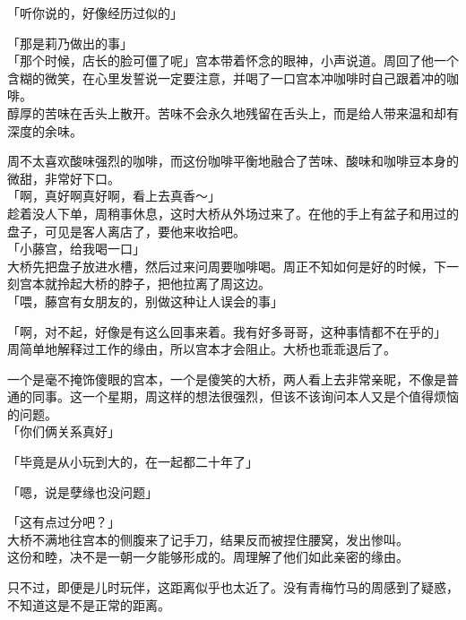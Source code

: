 「听你说的，好像经历过似的」

「那是莉乃做出的事」\\

「那个时候，店长的脸可僵了呢」宫本带着怀念的眼神，小声说道。周回了他一个含糊的微笑，在心里发誓说一定要注意，并喝了一口宫本冲咖啡时自己跟着冲的咖啡。\\

醇厚的苦味在舌头上散开。苦味不会永久地残留在舌头上，而是给人带来温和却有深度的余味。

周不太喜欢酸味强烈的咖啡，而这份咖啡平衡地融合了苦味、酸味和咖啡豆本身的微甜，非常好下口。\\

「啊，真好啊真好啊，看上去真香～」\\

趁着没人下单，周稍事休息，这时大桥从外场过来了。在他的手上有盆子和用过的盘子，可见是客人离店了，要他来收拾吧。\\

「小藤宫，给我喝一口」\\

大桥先把盘子放进水槽，然后过来问周要咖啡喝。周正不知如何是好的时候，下一刻宫本就拎起大桥的脖子，把他拉离了周这边。\\

「喂，藤宫有女朋友的，别做这种让人误会的事」

「啊，对不起，好像是有这么回事来着。我有好多哥哥，这种事情都不在乎的」\\

周简单地解释过工作的缘由，所以宫本才会阻止。大桥也乖乖退后了。

一个是毫不掩饰傻眼的宫本，一个是傻笑的大桥，两人看上去非常亲昵，不像是普通的同事。这一个星期，周这样的想法很强烈，但该不该询问本人又是个值得烦恼的问题。\\

「你们俩关系真好」

「毕竟是从小玩到大的，在一起都二十年了」

「嗯，说是孽缘也没问题」

「这有点过分吧？」\\

大桥不满地往宫本的侧腹来了记手刀，结果反而被捏住腰窝，发出惨叫。\\

这份和睦，决不是一朝一夕能够形成的。周理解了他们如此亲密的缘由。

只不过，即便是儿时玩伴，这距离似乎也太近了。没有青梅竹马的周感到了疑惑，不知道这是不是正常的距离。

